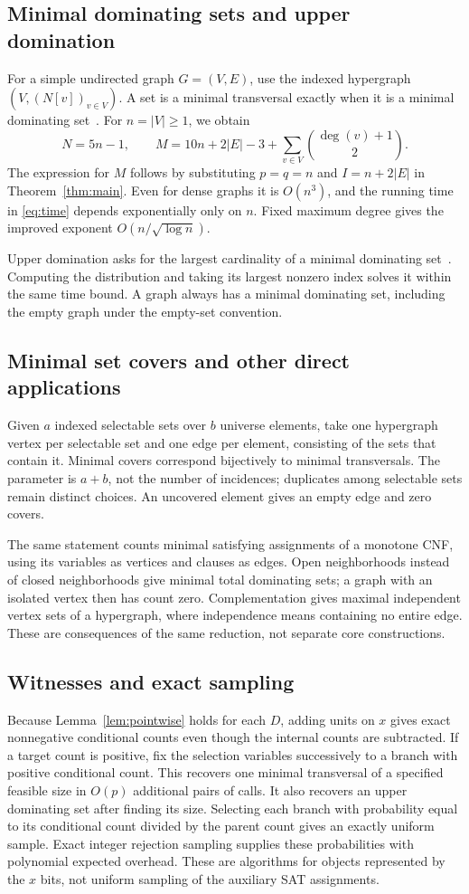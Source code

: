 \documentclass[11pt]{article}
\theoremstyle{remark}\newtheorem{remark}[theorem]{Remark}
\begin{document}
\subsection{Minimal dominating sets and upper domination}
For a simple undirected graph $G=(V,E)$, use the indexed hypergraph
$(V,(N[v])_{v\in V})$. A set is a minimal transversal exactly when it is a
minimal dominating set~\cite{bbcw}. For $n=|V|\ge1$, we obtain
\[
 N=5n-1,\qquad
 M=10n+2|E|-3+\sum_{v\in V}\binom{\deg(v)+1}{2}.
\]
The expression for $M$ follows by substituting $p=q=n$ and
$I=n+2|E|$ in Theorem~\ref{thm:main}. Even for dense graphs it is $O(n^3)$,
and the running time in \eqref{eq:time} depends exponentially only on $n$.
Fixed maximum degree gives the improved exponent $O(n/\sqrt{\log n})$.

Upper domination asks for the largest cardinality of a minimal dominating
set~\cite{upper}. Computing the distribution and taking its largest nonzero
index solves it within the same time bound. A graph always has a minimal
dominating set, including the empty graph under the empty-set convention.

\subsection{Minimal set covers and other direct applications}
Given $a$ indexed selectable sets over $b$ universe elements, take one
hypergraph vertex per selectable set and one edge per element, consisting
of the sets that contain it. Minimal covers correspond bijectively to
minimal transversals. The parameter is $a+b$, not the number of incidences;
duplicates among selectable sets remain distinct choices. An uncovered
element gives an empty edge and zero covers.

The same statement counts minimal satisfying assignments of a monotone CNF,
using its variables as vertices and clauses as edges. Open neighborhoods
instead of closed neighborhoods give minimal total dominating sets; a graph
with an isolated vertex then has count zero. Complementation gives maximal
independent vertex sets of a hypergraph, where independence means containing
no entire edge. These are consequences of the same reduction, not separate
core constructions.

\subsection{Witnesses and exact sampling}
Because Lemma~\ref{lem:pointwise} holds for each $D$, adding units on $x$
gives exact nonnegative conditional counts even though the internal counts
are subtracted. If a target count is positive, fix the selection variables
successively to a branch with positive conditional count. This recovers one
minimal transversal of a specified feasible size in $O(p)$ additional pairs
of calls. It also recovers an upper dominating set after finding its size.
Selecting each branch with probability equal to its conditional count divided
by the parent count gives an exactly uniform sample. Exact integer rejection
sampling supplies these probabilities with polynomial expected overhead.
These are algorithms for objects represented by the $x$ bits, not uniform
sampling of the auxiliary SAT assignments.
\end{document}
